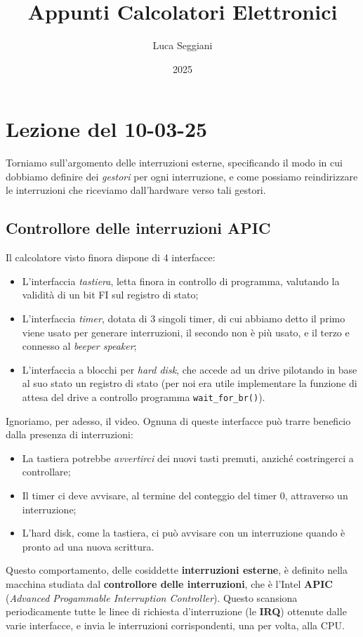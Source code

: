 \documentclass[a4paper,11pt]{article}
\title{Appunti Calcolatori Elettronici}
\author{Luca Seggiani}
\date{2025}
\begin{document}
\section{Lezione del 10-03-25}

\thispagestyle{empty}
\pagestyle{fancy}

Torniamo sull'argomento delle interruzioni esterne, specificando il modo in cui dobbiamo definire dei \textit{gestori} per ogni interruzione, e come possiamo reindirizzare le interruzioni che riceviamo dall'hardware verso tali gestori.

\subsection{Controllore delle interruzioni APIC}
Il calcolatore visto finora dispone di 4 interfacce: \begin{itemize}
	\item L'interfaccia \textit{tastiera}, letta finora in controllo di programma, valutando la validità di un bit FI sul registro di stato;
	\item L'interfaccia \textit{timer}, dotata di 3 singoli timer, di cui abbiamo detto il primo viene usato per generare interruzioni, il secondo non è più usato, e il terzo e connesso al \textit{beeper speaker};
	\item L'interfaccia a blocchi per \textit{hard disk}, che accede ad un drive pilotando in base al suo stato un registro di stato (per noi era utile implementare la funzione di attesa del drive a controllo programma \lstinline|wait_for_br()|).
\end{itemize} 

Ignoriamo, per adesso, il video.
Ognuna di queste interfacce può trarre beneficio dalla presenza di interruzioni:
\begin{itemize}
	\item La tastiera potrebbe \textit{avvertirci} dei nuovi tasti premuti, anziché costringerci a controllare;
	\item Il timer ci deve avvisare, al termine del conteggio del timer 0, attraverso un interruzione;
	\item L'hard disk, come la tastiera, ci può avvisare con un interruzione quando è pronto ad una nuova scrittura.
\end{itemize}

Questo comportamento, delle cosiddette \textbf{interruzioni esterne}, è definito nella macchina studiata dal \textbf{controllore delle interruzioni}, che è l'Intel \textbf{APIC} (\textit{Advanced Progammable Interruption Controller}).
Questo scansiona periodicamente tutte le linee di richiesta d'interruzione (le \textbf{IRQ}) ottenute dalle varie interfacce, e invia le interruzioni corrispondenti, una per volta, alla CPU. 
\end{document}
